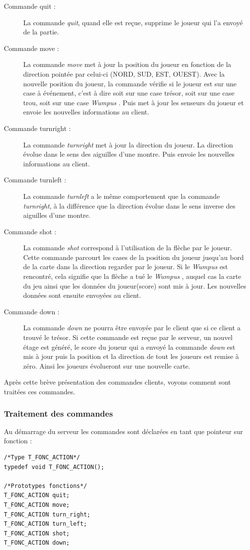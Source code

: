 \documentclass[a4paper,10pt]{article}
\newcommand{\gameName}{\emph{Wumpus }}
\begin{document}
	\begin{description}
		\item[Commande quit : ] La commande \emph{quit}, quand elle est reçue, supprime le joueur qui l'a envoyé de la partie.
		\item[Commande move : ] La commande \emph{move} met à jour la position du joueur en fonction de la direction pointée par celui-ci (NORD, SUD, EST, OUEST).
Avec la nouvelle position du joueur, la commande vérifie si le joueur est sur une case à événement, c'est à dire soit sur une case trésor, soit sur une case
trou, soit sur une case \gameName. Puis met à jour les senseurs du joueur et envoie les nouvelles informations au client.
		\item[Commande turnright : ] La commande \emph{turnright} met à jour la direction du joueur. La direction évolue dans le sens des aiguilles d'une
montre. Puis envoie les nouvelles informations au client.
		\item[Commande turnleft : ] La commande \emph{turnleft} a le même comportement que la commande \emph{turnright}, à la différence que la direction
évolue dans le sens inverse des aiguilles d'une montre.
		\item[Commande shot : ] La commande \emph{shot} correspond à l'utilisation de la flèche par le joueur. Cette commande parcourt les cases de la position
du joueur jusqu'au bord de la carte dans la direction regarder par le joueur. Si le \gameName est rencontré, cela signifie que la flèche a tué le \gameName,
auquel cas la carte du jeu ainsi que les données du joueur(score) sont mis à jour. Les nouvelles données sont ensuite envoyées au client.
		\item[Commande down : ] La commande \emph{down} ne pourra être envoyée par le client que si ce client a trouvé le trésor. Si cette commande est reçue par
le serveur, un nouvel étage est généré, le score du joueur qui a envoyé la commande \emph{down} est mis à jour puis la position et la direction de tout les
joueurs est remise à zéro. Ainsi les joueurs évolueront sur une nouvelle carte.
	\end{description}

	Après cette brève présentation des commandes clients, voyons comment sont traitées ces commandes.
	\subsubsection{Traitement des commandes}
	\label{subsubTraitCommandes}

	Au démarrage du serveur les commandes sont déclarées en tant que pointeur sur fonction :
	\begin{lstlisting}
/*Type T_FONC_ACTION*/
typedef void T_FONC_ACTION();

/*Prototypes fonctions*/
T_FONC_ACTION quit;
T_FONC_ACTION move;
T_FONC_ACTION turn_right;
T_FONC_ACTION turn_left;
T_FONC_ACTION shot;
T_FONC_ACTION down;

	\end{lstlisting}
\end{document}
